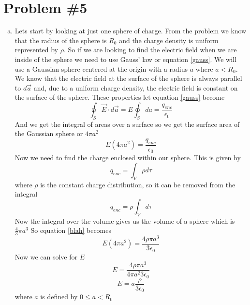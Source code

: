 \documentclass[11pt]{article}
\numberwithin{equation}{section}
\begin{document}
\section{Problem \#5}
\begin{enumerate}[(a)]
\item 
Lets start by looking at just one sphere of charge. From the problem we know that the radius of the sphere is $R_0$ and the charge density is uniform represented by $\rho$. So if we are looking to find the electric field when we are inside of the sphere we need to use Gauss' law or equation \ref{gauss}. We will use a Gaussian sphere centered at the origin with a radius $a$ where $a < R_0$. We know that the electric field at the surface of the sphere is always parallel to $d\vec{a}$ and, due to a uniform charge density, the electric field is constant on the surface of the sphere. These properties let equation \ref{gauss} become
$$\oint_S \vec{E} \cdot d\vec{a} = E\oint_S da = \frac{q_{enc}}{\epsilon_0}$$
And we get the integral of areas over a surface so we get the surface area of the Gaussian sphere or $4\pi a^2$
\begin{equation}
E(4\pi a^2)= \frac{q_{enc}}{\epsilon_0}
\label{blah}
\end{equation}
Now we need to find the charge enclosed within our sphere. This is given by
$$q_{enc} = \int_V \rho d\tau$$
where $\rho$ is the constant charge distribution, so it can be removed from the integral
$$q_{enc} = \rho \int_V d\tau$$
Now the integral over the volume gives us the volume of a sphere which is $\frac{4}{3}\pi a^3$
So equation \ref{blah} becomes
$$E(4\pi a^2)= \frac{4\rho \pi a^3}{3\epsilon_0}$$
Now we can solve for $E$
$$E =\frac{4\rho \pi a^3}{4 \pi a^2 3\epsilon_0}$$
\begin{equation}
E =a\frac{\rho}{3\epsilon_0}
\label{onesph}
\end{equation}
where $a$ is defined by $0\le a<R_0$


\end{enumerate}
\end{document}

